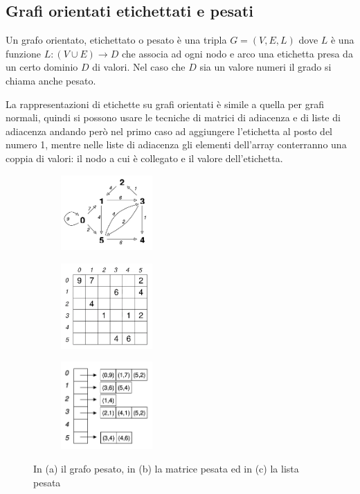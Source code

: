 \subsection{Grafi orientati etichettati e pesati}
\begin{definition}
    Un grafo orientato, etichettato o pesato è una tripla $G = (V,E,L)$ dove $L$ è una funzione $L: (V \cup E) \to D$ che associa ad ogni nodo e arco una etichetta presa da un certo dominio $D$ di valori. Nel caso che $D$ sia un valore numeri il grado si chiama anche pesato.
\end{definition}
La rappresentazioni di etichette su grafi orientati è simile a quella per grafi normali, quindi si possono usare le tecniche di matrici di adiacenza e di liste di adiacenza andando però nel primo caso ad aggiungere l'etichetta al posto del numero 1, mentre nelle liste di adiacenza gli elementi dell'array conterranno una coppia di valori: il nodo a cui è collegato e il valore dell'etichetta.
\begin{figure}[h!]
    \centering
    \begin{subfigure}{.3\textwidth}
        \centering
        \includegraphics[width=3.5cm]{images/esempio-grafo-pesato.png}
        \caption{}
    \end{subfigure}
    \hfill
    \begin{subfigure}{.3\textwidth}
        \centering
        \includegraphics[width=3.5cm]{images/matrice-adiacenza-pesata.png}
        \caption{}
    \end{subfigure}
    \hfill
    \begin{subfigure}{.3\textwidth}
        \centering
        \includegraphics[width=3.5cm]{images/lista-adiacenza-pesata.png}
        \caption{}
    \end{subfigure}
    \vspace{-5pt}
    \caption{In (a) il grafo pesato, in (b) la matrice pesata ed in (c) la lista pesata}
\end{figure}

